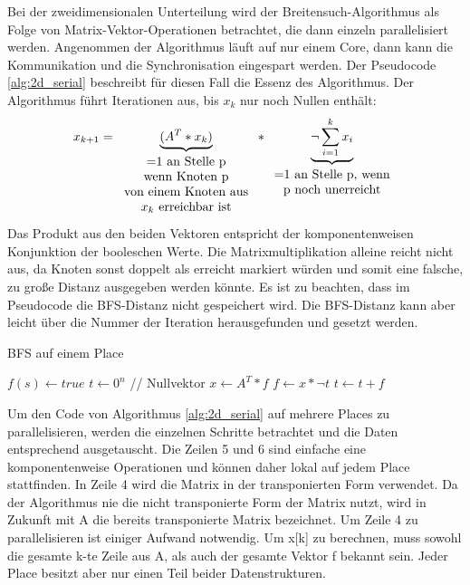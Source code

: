 Bei der zweidimensionalen Unterteilung wird der Breitensuch-Algorithmus als Folge von Matrix-Vektor-Operationen betrachtet, die dann einzeln parallelisiert werden. Angenommen der Algorithmus läuft auf nur einem Core, dann kann die Kommunikation und die Synchronisation eingespart werden. Der Pseudocode \ref{alg:2d_serial} beschreibt für diesen Fall die Essenz des Algorithmus. Der Algorithmus führt Iterationen aus, bis $x_k$ nur noch Nullen enthält: 
$$
x_{k+1} = \underbrace{ (A^T * x_k) }_{ \begin{tabular}{c} =1 an Stelle p \\ wenn Knoten p \\ von einem Knoten aus \\ $x_k$ erreichbar ist \end{tabular}} * \underbrace{\neg\sum_{i=1}^k x_i}_{\begin{tabular}{c} =1 an Stelle p, wenn \\ p noch unerreicht\end{tabular}}
$$ 
Das Produkt aus den beiden Vektoren entspricht der komponentenweisen Konjunktion der booleschen Werte. Die Matrixmultiplikation alleine reicht nicht aus, da Knoten sonst doppelt als erreicht markiert würden und somit eine falsche, zu große Distanz ausgegeben werden könnte. Es ist zu beachten, dass im Pseudocode die BFS-Distanz nicht gespeichert wird. Die BFS-Distanz kann aber leicht über die Nummer der Iteration herausgefunden und gesetzt werden. 

\begin{algorithm}[ht]
	\caption{BFS auf einem Place}
	\label{alg:2d_serial}
	\begin{algorithmic}[1]
		\State $f(s) \gets true$
		\State $t \gets 0^n$ // Nullvektor
			\State $x \gets A^T * f$
			\State $f \gets x * \neg t$
			\State $t \gets t + f$
		\EndWhile
	\end{algorithmic}
\end{algorithm}

Um den Code von Algorithmus \ref{alg:2d_serial} auf mehrere Places zu parallelisieren, werden die einzelnen Schritte betrachtet und die Daten entsprechend ausgetauscht. Die Zeilen 5 und 6 sind einfache eine komponentenweise Operationen und können daher lokal auf jedem Place stattfinden. In Zeile 4 wird die Matrix in der transponierten Form verwendet. Da der Algorithmus nie die nicht transponierte Form der Matrix nutzt, wird in Zukunft mit A die bereits transponierte Matrix bezeichnet. Um Zeile 4 zu parallelisieren ist einiger Aufwand notwendig. Um x[k] zu berechnen, muss sowohl die gesamte k-te Zeile aus A, als auch der gesamte Vektor f bekannt sein. Jeder Place besitzt aber nur einen Teil beider Datenstrukturen.



